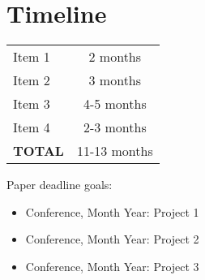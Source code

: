 \documentclass{article}
\begin{document}









\section{Timeline}

\begin{center}
\begin{tabular}{|l|c|}
\hline
Item 1 & 2 months \\
Item 2 & 3 months \\
Item 3 & 4-5 months \\
Item 4 & 2-3 months \\
\hline
\textbf{TOTAL} & 11-13 months \\
\hline
\end{tabular}
\end{center}

Paper deadline goals:

\begin{itemize}
\item Conference, Month Year: Project 1
\item Conference, Month Year: Project 2
\item Conference, Month Year: Project 3
\end{itemize}
\end{document}
